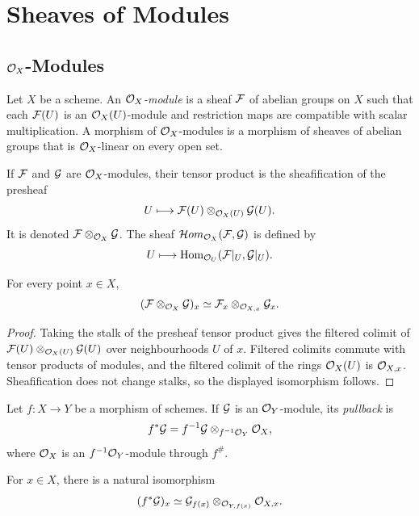 \chapter{Sheaves of Modules}

\section{\texorpdfstring{\(\mathcal{O}_X\)}{OX}-Modules}

\begin{definition}
Let \(X\) be a scheme.  An \emph{\(\mathcal{O}_X\)-module} is a sheaf \(\mathcal{F}\) of
abelian groups on \(X\) such that each \(\mathcal{F}(U)\) is an \(\mathcal{O}_X(U)\)-module and
restriction maps are compatible with scalar multiplication.  A morphism of
\(\mathcal{O}_X\)-modules is a morphism of sheaves of abelian groups that is
\(\mathcal{O}_X\)-linear on every open set.
\end{definition}

\begin{definition}
If \(\mathcal{F}\) and \(\mathcal{G}\) are \(\mathcal{O}_X\)-modules, their tensor product is the
sheafification of the presheaf
\[
    U\longmapsto \mathcal{F}(U)\otimes_{\mathcal{O}_X(U)}\mathcal{G}(U).
\]
It is denoted \(\mathcal{F}\otimes_{\mathcal{O}_X}\mathcal{G}\).  The sheaf
\(\mathcal{H}om_{\mathcal{O}_X}(\mathcal{F},\mathcal{G})\) is defined by
\[
    U\longmapsto \operatorname{Hom}_{\mathcal{O}_U}(\mathcal{F}|_U,\mathcal{G}|_U).
\]
\end{definition}

\begin{proposition}
For every point \(x\in X\),
\[
    (\mathcal{F}\otimes_{\mathcal{O}_X}\mathcal{G})_x
    \simeq
    \mathcal{F}_x\otimes_{\mathcal{O}_{X,x}}\mathcal{G}_x.
\]
\end{proposition}

\begin{proof}
Taking the stalk of the presheaf tensor product gives the filtered colimit of
\(\mathcal{F}(U)\otimes_{\mathcal{O}_X(U)}\mathcal{G}(U)\) over neighbourhoods \(U\) of \(x\).
Filtered colimits commute with tensor products of modules, and the filtered
colimit of the rings \(\mathcal{O}_X(U)\) is \(\mathcal{O}_{X,x}\).  Sheafification does not
change stalks, so the displayed isomorphism follows.
\end{proof}

\begin{definition}
Let \(f:X\to Y\) be a morphism of schemes.  If \(\mathcal{G}\) is an \(\mathcal{O}_Y\)-module,
its \emph{pullback} is
\[
    f^*\mathcal{G}=f^{-1}\mathcal{G}\otimes_{f^{-1}\mathcal{O}_Y}\mathcal{O}_X,
\]
where \(\mathcal{O}_X\) is an \(f^{-1}\mathcal{O}_Y\)-module through \(f^\#\).
\end{definition}

\begin{proposition}
For \(x\in X\), there is a natural isomorphism
\[
    (f^*\mathcal{G})_x\simeq \mathcal{G}_{f(x)}\otimes_{\mathcal{O}_{Y,f(x)}}\mathcal{O}_{X,x}.
\]
\end{proposition}

